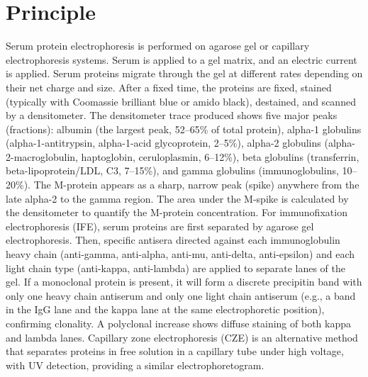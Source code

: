 \section*{Principle}
Serum protein electrophoresis is performed on agarose gel or capillary electrophoresis systems. Serum is applied to a gel matrix, and an electric current is applied. Serum proteins migrate through the gel at different rates depending on their net charge and size. After a fixed time, the proteins are fixed, stained (typically with Coomassie brilliant blue or amido black), destained, and scanned by a densitometer. The densitometer trace produced shows five major peaks (fractions): albumin (the largest peak, 52--65\% of total protein), alpha-1 globulins (alpha-1-antitrypsin, alpha-1-acid glycoprotein, 2--5\%), alpha-2 globulins (alpha-2-macroglobulin, haptoglobin, ceruloplasmin, 6--12\%), beta globulins (transferrin, beta-lipoprotein/LDL, C3, 7--15\%), and gamma globulins (immunoglobulins, 10--20\%). The M-protein appears as a sharp, narrow peak (spike) anywhere from the late alpha-2 to the gamma region. The area under the M-spike is calculated by the densitometer to quantify the M-protein concentration. For immunofixation electrophoresis (IFE), serum proteins are first separated by agarose gel electrophoresis. Then, specific antisera directed against each immunoglobulin heavy chain (anti-gamma, anti-alpha, anti-mu, anti-delta, anti-epsilon) and each light chain type (anti-kappa, anti-lambda) are applied to separate lanes of the gel. If a monoclonal protein is present, it will form a discrete precipitin band with only one heavy chain antiserum and only one light chain antiserum (e.g., a band in the IgG lane and the kappa lane at the same electrophoretic position), confirming clonality. A polyclonal increase shows diffuse staining of both kappa and lambda lanes. Capillary zone electrophoresis (CZE) is an alternative method that separates proteins in free solution in a capillary tube under high voltage, with UV detection, providing a similar electrophoretogram.

